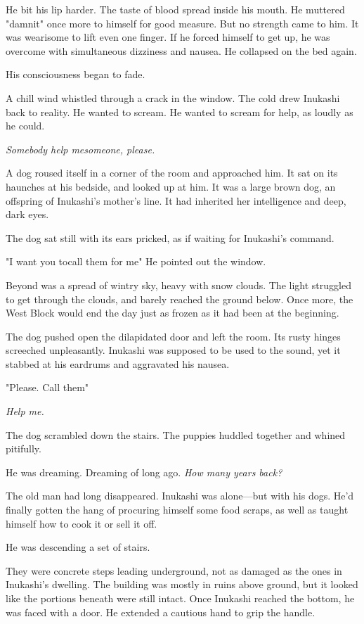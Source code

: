 He bit his lip harder. The taste of blood spread inside his mouth. He
muttered "damnit" once more to himself for good measure. But no strength
came to him. It was wearisome to lift even one finger. If he forced
himself to get up, he was overcome with simultaneous dizziness and
nausea. He collapsed on the bed again.

His consciousness began to fade.

A chill wind whistled through a crack in the window. The cold drew
Inukashi back to reality. He wanted to scream. He wanted to scream for
help, as loudly as he could.

\emph{Somebody help me\el someone, please.}

A dog roused itself in a corner of the room and approached him. It sat
on its haunches at his bedside, and looked up at him. It was a large
brown dog, an offspring of Inukashi's mother's line. It had inherited
her intelligence and deep, dark eyes.

The dog sat still with its ears pricked, as if waiting for Inukashi's
command.

"\el I want you to\el call them for me\el " He pointed out the window.

Beyond was a spread of wintry sky, heavy with snow clouds. The light
struggled to get through the clouds, and barely reached the ground
below. Once more, the West Block would end the day just as frozen as it
had been at the beginning.

The dog pushed open the dilapidated door and left the room. Its rusty
hinges screeched unpleasantly. Inukashi was supposed to be used to the
sound, yet it stabbed at his eardrums and aggravated his nausea.

"Please. Call them\el "

\emph{Help me.}

The dog scrambled down the stairs. The puppies huddled together and
whined pitifully.

\myspace

He was dreaming. Dreaming of long ago. \emph{How many years back?}

The old man had long disappeared. Inukashi was alone---but with his dogs.
He'd finally gotten the hang of procuring himself some food scraps, as
well as taught himself how to cook it or sell it off.

He was descending a set of stairs.

They were concrete steps leading underground, not as damaged as the ones
in Inukashi's dwelling. The building was mostly in ruins above ground,
but it looked like the portions beneath were still intact. Once Inukashi
reached the bottom, he was faced with a door. He extended a cautious
hand to grip the handle.


